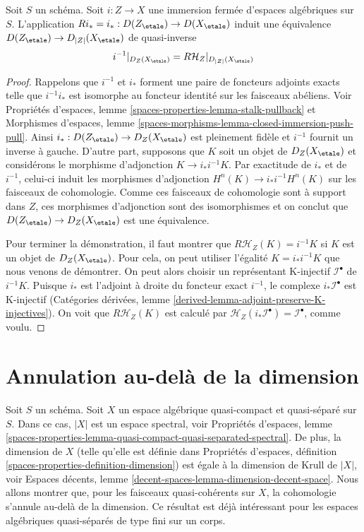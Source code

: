 \begin{lemma}
\label{lemma-complexes-with-support-on-closed}
Soit $S$ un schéma.
Soit $i : Z \to X$ une immersion fermée d'espaces algébriques sur $S$.
L'application $Ri_* = i_* : D(Z_\etale) \to D(X_\etale)$
induit une équivalence $D(Z_\etale) \to D_{|Z|}(X_\etale)$ de quasi-inverse
$$
i^{-1}|_{D_Z(X_\etale)} = R\mathcal{H}_Z|_{D_{|Z|}(X_\etale)}
$$
\end{lemma}

\begin{proof}
Rappelons que $i^{-1}$ et $i_*$ forment une paire de foncteurs adjoints
exacts telle que $i^{-1}i_*$ est isomorphe au foncteur identité
sur les faisceaux abéliens. Voir
Propriétés d'espaces, lemme
\ref{spaces-properties-lemma-stalk-pullback} et
Morphismes d'espaces, lemme
\ref{spaces-morphisms-lemma-closed-immersion-push-pull}.
Ainsi $i_* : D(Z_\etale) \to D_Z(X_\etale)$ est pleinement fidèle et
$i^{-1}$ fournit
un inverse à gauche. D'autre part, supposons que $K$ soit un objet de
$D_Z(X_\etale)$ et considérons le morphisme d'adjonction
$K \to i_*i^{-1}K$.
Par exactitude de $i_*$ et de $i^{-1}$,
celui-ci induit les morphismes d'adjonction
$H^n(K) \to i_*i^{-1}H^n(K)$ sur les faisceaux de cohomologie.
Comme ces faisceaux de cohomologie
sont à support dans $Z$, ces morphismes d'adjonction sont des isomorphismes
et on conclut que $D(Z_\etale) \to D_Z(X_\etale)$ est une équivalence.

\medskip\noindent
Pour terminer la démonstration, il faut montrer que $R\mathcal{H}_Z(K) = i^{-1}K$
si $K$ est un objet de $D_Z(X_\etale)$. Pour cela, on peut utiliser l'égalité
$K = i_*i^{-1}K$
que nous venons de démontrer. On peut alors
choisir un représentant K-injectif $\mathcal{I}^\bullet$ de
$i^{-1}K$.
Puisque $i_*$ est l'adjoint à droite du foncteur exact
$i^{-1}$, le
complexe $i_*\mathcal{I}^\bullet$ est K-injectif
(Catégories dérivées, lemme \ref{derived-lemma-adjoint-preserve-K-injectives}).
On voit que $R\mathcal{H}_Z(K)$ est calculé par
$\mathcal{H}_Z(i_*\mathcal{I}^\bullet) = \mathcal{I}^\bullet$,
comme voulu.
\end{proof}






\section{Annulation au-delà de la dimension}
\label{section-vanishing-above-dimension}

\noindent
Soit $S$ un schéma. Soit $X$ un espace algébrique quasi-compact et quasi-séparé
sur $S$. Dans ce cas, $|X|$ est un espace spectral, voir
Propriétés d'espaces, lemme
\ref{spaces-properties-lemma-quasi-compact-quasi-separated-spectral}.
De plus, la dimension de $X$ (telle qu'elle est définie dans
Propriétés d'espaces, définition \ref{spaces-properties-definition-dimension})
est égale à la dimension de Krull de $|X|$, voir
Espaces décents, lemme \ref{decent-spaces-lemma-dimension-decent-space}.
Nous allons montrer que, pour les faisceaux quasi-cohérents sur $X$, la
cohomologie s'annule au-delà de la dimension. Ce résultat est déjà intéressant pour les
espaces algébriques quasi-séparés de type fini sur un corps.

